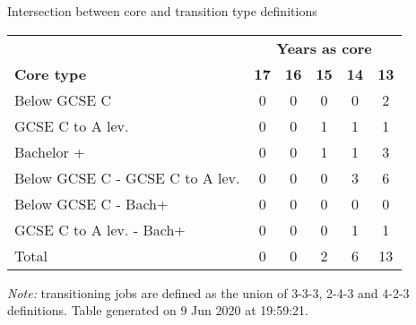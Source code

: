 \begin{center}
\begin{threeparttable}[!h]
\caption{Intersection between core and transition type definitions}
\begin{tabular}{lccccc}
\toprule
\toprule
& \multicolumn{5}{c}{\textbf{Years as core}} \\
\cline{2-6}
\textbf{Core type}&\multicolumn{1}{c}{\textbf{17}}&\multicolumn{1}{c}{\textbf{16}}&\multicolumn{1}{c}{\textbf{15}}&\multicolumn{1}{c}{\textbf{14}}&\multicolumn{1}{c}{\textbf{13}} \\
\midrule
\midrule
Below GCSE C&0&0&0&0&2 \\
GCSE C to A lev.&0&0&1&1&1 \\
Bachelor +&0&0&1&1&3 \\
Below GCSE C - GCSE C to A lev.&0&0&0&3&6 \\
Below GCSE C - Bach+&0&0&0&0&0 \\
GCSE C to A lev. - Bach+&0&0&0&1&1 \\
Total&0&0&2&6&13 \\
\bottomrule
\bottomrule
\end{tabular}
\begin{tablenotes}
\item \footnotesize \textit{Note:} transitioning jobs are defined as the union of 3-3-3, 2-4-3 and 4-2-3 definitions. Table generated on  9 Jun 2020 at 19:59:21.
\end{tablenotes}
\end{threeparttable}
\end{center}
